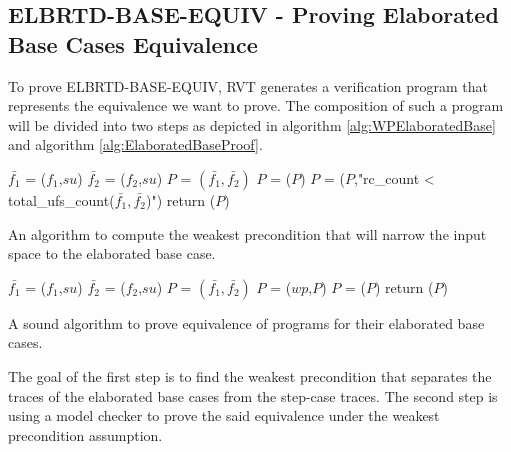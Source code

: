 \subsection{ELBRTD-BASE-EQUIV - Proving Elaborated Base Cases Equivalence}
\label{sec:ELBRTD-BASE-EQUIV}
To prove ELBRTD-BASE-EQUIV, RVT generates a verification program that represents the equivalence we want to prove. The composition of such a program will be divided into two steps as depicted in algorithm \ref{alg:WPElaboratedBase} and algorithm  \ref{alg:ElaboratedBaseProof}.
\noindent
\begin{algorithm}
\begin{minipage}{\linewidth}
\begin{algorithmic}[1]
	\State$\bar{f_1}$ = ($f_1$,$su$)
	\State$\bar{f_2}$ = ($f_2$,$su$)
	\State $P$ = $(\bar{f_1},\bar{f_2})$
	\State $P$ = ($P$)
    \State $P$ = ($P$,"rc\_count < total\_ufs\_count($\bar{f_1},\bar{f_2}$)")
    \State return ($P$)
	\EndFunction
\end{algorithmic}
\end{minipage}
\caption{An algorithm to compute the weakest precondition that will narrow the input space to the elaborated base case.}
\label{alg:WPElaboratedBase}
\end{algorithm}
\noindent
\begin{algorithm}
\begin{minipage}{\linewidth}
\begin{algorithmic}[1]
	\State$\bar{f_1}$ = ($f_1$,$su$)
	\State$\bar{f_2}$ = ($f_2$,$su$)
	\State $P$ = $(\bar{f_1},\bar{f_2})$
    \State $P$ = ($wp$,$P$)
    \State $P$ = ($P$)
    \State return ($P$)
	\EndFunction
\end{algorithmic}
\end{minipage}
\caption{A sound algorithm to prove equivalence of programs for their elaborated base cases.}
\label{alg:ElaboratedBaseProof}
\end{algorithm}
The goal of the first step is to find the weakest precondition that separates the traces of the elaborated base cases from the step-case traces. The second step is using a model checker to prove the said equivalence under the weakest precondition assumption.
